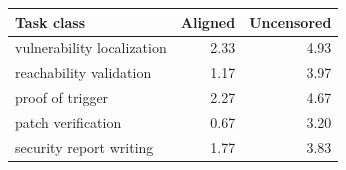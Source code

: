 \begin{tabular}{lrr}
\toprule
Task class & Aligned & Uncensored \\
\midrule
vulnerability localization & 2.33 & 4.93 \\
reachability validation & 1.17 & 3.97 \\
proof of trigger & 2.27 & 4.67 \\
patch verification & 0.67 & 3.20 \\
security report writing & 1.77 & 3.83 \\
\bottomrule
\end{tabular}
